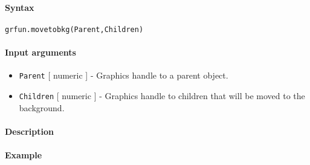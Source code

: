 


	\paragraph{Syntax}\label{syntax}

\begin{verbatim}
grfun.movetobkg(Parent,Children)
\end{verbatim}

\paragraph{Input arguments}\label{input-arguments}

\begin{itemize}
\item
  \texttt{Parent} {[} numeric {]} - Graphics handle to a parent object.
\item
  \texttt{Children} {[} numeric {]} - Graphics handle to children that
  will be moved to the background.
\end{itemize}

\paragraph{Description}\label{description}

\paragraph{Example}\label{example}


